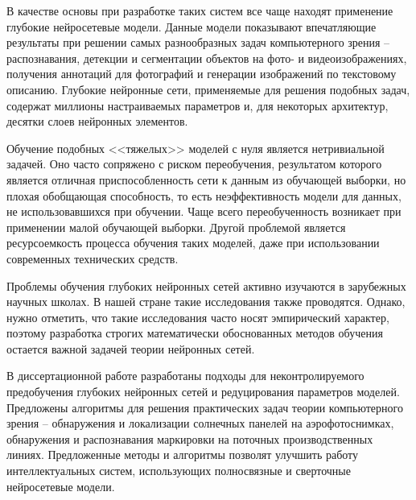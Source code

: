 В качестве основы при разработке таких систем все чаще находят применение глубокие нейросетевые модели. Данные модели показывают впечатляющие результаты при решении самых разнообразных задач компьютерного зрения -- распознавания, детекции и сегментации объектов на фото- и видеоизображениях, получения аннотаций для фотографий и генерации изображений по текстовому описанию. Глубокие нейронные сети, применяемые для решения подобных задач, содержат миллионы настраиваемых параметров и, для некоторых архитектур, десятки слоев нейронных элементов.

Обучение подобных <<тяжелых>> моделей с нуля является нетривиальной задачей. Оно часто сопряжено с риском переобучения, результатом которого является отличная приспособленность сети к данным из обучающей выборки, но плохая обобщающая способность, то есть неэффективность модели для данных, не использовавшихся при обучении. Чаще всего переобученность возникает при применении малой обучающей выборки. Другой проблемой является ресурсоемкость процесса обучения таких моделей, даже при использовании современных технических средств.

Проблемы обучения глубоких нейронных сетей активно изучаются в зарубежных научных школах. В нашей стране такие исследования также проводятся. Однако, нужно отметить, что такие исследования часто носят эмпирический характер, поэтому разработка строгих математически обоснованных методов обучения остается важной задачей теории нейронных сетей.

В диссертационной работе разработаны подходы для неконтролируемого предобучения глубоких нейронных сетей и редуцирования параметров моделей. Предложены алгоритмы для решения практических задач теории компьютерного зрения -- обнаружения и локализации солнечных панелей на аэрофотоснимках, обнаружения и распознавания маркировки на поточных производственных линиях. Предложенные методы и алгоритмы позволят улучшить работу интеллектуальных систем, использующих полносвязные и сверточные нейросетевые модели.
